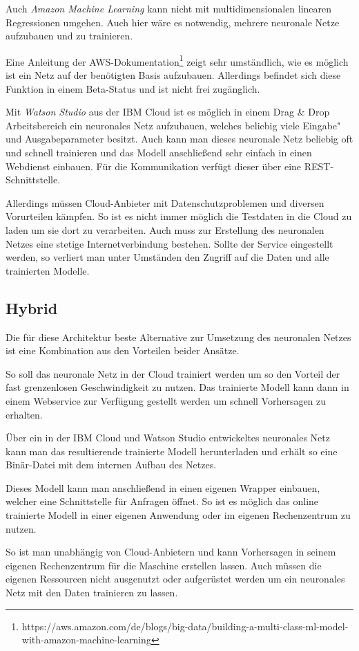 Auch \textit{Amazon Machine Learning} kann nicht mit multidimensionalen linearen Regressionen umgehen. Auch hier wäre es
notwendig, mehrere neuronale Netze aufzubauen und zu trainieren.

Eine Anleitung der
AWS-Dokumentation\footnote{https://aws.amazon.com/de/blogs/big-data/building-a-multi-class-ml-model-with-amazon-machine-learning}
zeigt sehr umständlich, wie es möglich ist ein Netz auf der benötigten Basis aufzubauen. Allerdings befindet sich diese
Funktion in einem Beta-Status und ist nicht frei zugänglich.

Mit \textit{Watson Studio} aus der IBM Cloud ist es möglich in einem Drag \& Drop Arbeitsbereich ein neuronales Netz
aufzubauen, welches beliebig viele Eingabe"~ und Ausgabeparameter besitzt. Auch kann man dieses neuronale Netz beliebig
oft und schnell trainieren und das Modell anschließend sehr einfach in einen Webdienst einbauen. Für die Kommunikation
verfügt dieser über eine REST-Schnittstelle.

Allerdings müssen Cloud-Anbieter mit Datenschutzproblemen und diversen Vorurteilen kämpfen. So ist es nicht immer
möglich die Testdaten in die Cloud zu laden um sie dort zu verarbeiten. Auch muss zur Erstellung des neuronalen Netzes
eine stetige Internetverbindung bestehen. Sollte der Service eingestellt werden, so verliert man unter Umständen den
Zugriff auf die Daten und alle trainierten Modelle.

\subsection{Hybrid}
Die für diese Architektur beste Alternative zur Umsetzung des neuronalen Netzes ist eine Kombination aus den Vorteilen
beider Ansätze.

So soll das neuronale Netz in der Cloud trainiert werden um so den Vorteil der fast grenzenlosen Geschwindigkeit zu
nutzen. Das trainierte Modell kann dann in einem Webservice zur Verfügung gestellt werden um schnell Vorhersagen zu
erhalten.

Über ein in der IBM Cloud und Watson Studio entwickeltes neuronales Netz kann man das resultierende trainierte Modell
herunterladen und erhält so eine Binär-Datei mit dem internen Aufbau des Netzes.

Dieses Modell kann man anschließend in einen eigenen Wrapper einbauen, welcher eine Schnittstelle für Anfragen öffnet.
So ist es möglich das online trainierte Modell in einer eigenen Anwendung oder im eigenen Rechenzentrum zu nutzen.

So ist man unabhängig von Cloud-Anbietern und kann Vorhersagen in seinem eigenen Rechenzentrum für die Maschine
erstellen lassen. Auch müssen die eigenen Ressourcen nicht ausgenutzt oder aufgerüstet werden um ein neuronales Netz mit
den Daten trainieren zu lassen.